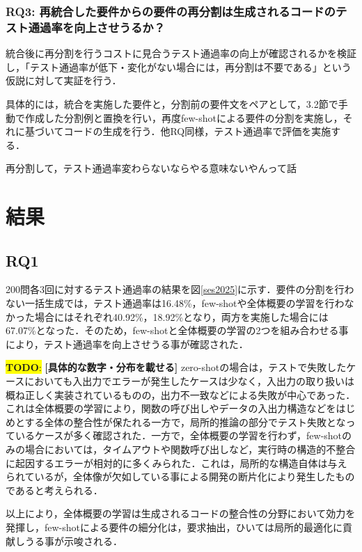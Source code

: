 \documentclass[submit,techrep,noauthor]{ipsj}
\newcommand{\todo}[1]{\colorbox{yellow}{{\bf TODO}:}{\color{red} {\textbf{[#1]}}}}
\begin{document}
\subsubsection{RQ3: 再統合した要件からの要件の再分割は生成されるコードのテスト通過率を向上させうるか？}
統合後に再分割を行うコストに見合うテスト通過率の向上が確認されるかを検証し，「テスト通過率が低下・変化がない場合には，再分割は不要である」という仮説に対して実証を行う．

具体的には，統合を実施した要件と，分割前の要件文をペアとして，3.2節で手動で作成した分割例と置換を行い，再度few-shotによる要件の分割を実施し，それに基づいてコードの生成を行う．他RQ同様，テスト通過率で評価を実施する．

再分割して，テスト通過率変わらないならやる意味ないやんって話

\section{結果}
\label{sec:result}

\subsection{RQ1}
200問各3回に対するテスト通過率の結果を図\ref{ses2025}に示す．要件の分割を行わない一括生成では，テスト通過率は16.48\%，few-shotや全体概要の学習を行わなかった場合にはそれぞれ40.92\%，18.92\%となり，両方を実施した場合には67.07\%となった．そのため，few-shotと全体概要の学習の2つを組み合わせる事により，テスト通過率を向上させうる事が確認された．

\todo{具体的な数字・分布を載せる}
zero-shotの場合は，テストで失敗したケースにおいても入出力でエラーが発生したケースは少なく，入出力の取り扱いは概ね正しく実装されているものの，出力不一致などによる失敗が中心であった．これは全体概要の学習により，関数の呼び出しやデータの入出力構造などをはじめとする全体の整合性が保たれる一方で，局所的推論の部分でテスト失敗となっているケースが多く確認された．一方で，全体概要の学習を行わず，few-shotのみの場合においては，タイムアウトや関数呼び出しなど，実行時の構造的不整合に起因するエラーが相対的に多くみられた．これは，局所的な構造自体は与えられているが，全体像が欠如している事による開発の断片化により発生したものであると考えられる．

以上により，全体概要の学習は生成されるコードの整合性の分野において効力を発揮し，few-shotによる要件の細分化は，要求抽出，ひいては局所的最適化に貢献しうる事が示唆される．
\end{document}
